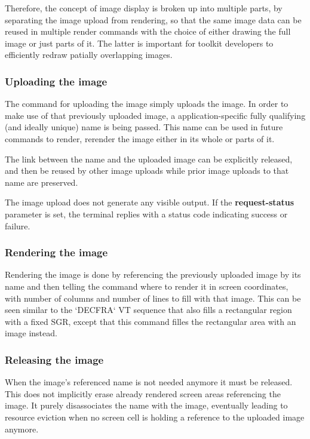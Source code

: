 \documentclass[a4paper]{article}
\begin{document}
Therefore, the concept of image display is broken up into multiple parts,
by separating the image upload from rendering, so
that the same image data can be reused in multiple render commands with
the choice of either drawing the full image or just parts of it.
The latter is important for toolkit developers to efficiently redraw
patially overlapping images.

\subsubsection*{Uploading the image} %

The command for uploading the image simply uploads the image.
In order to make use of that previously uploaded image, a application-specific
fully qualifying (and ideally unique) name is being passed.
This name can be used in future commands to render, rerender the image
either in its whole or parts of it.

The link between the name and the uploaded image can be explicitly released,
and then be reused by other image uploads while prior image uploads to that
name are preserved.

The image upload does not generate any visible output.
If the \textbf{request-status} parameter is set,
the terminal replies with a status code indicating success or failure.

\subsubsection*{Rendering the image} %

Rendering the image is done by referencing the previously uploaded
image by its name and then telling the command where to render it
in screen coordinates, with number of columns and number of lines to fill
with that image. This can be seen similar to the `DECFRA` VT sequence
that also fills a rectangular region with a fixed SGR, except
that this command filles the rectangular area with an image instead.

\subsubsection*{Releasing the image} %

When the image's referenced name is not needed anymore it must be released.
This does not implicitly erase already rendered screen areas referencing the image.
It purely disassociates the name with the image, eventually leading
to resource eviction when no screen cell is holding a reference to the
uploaded image anymore.
\end{document}
